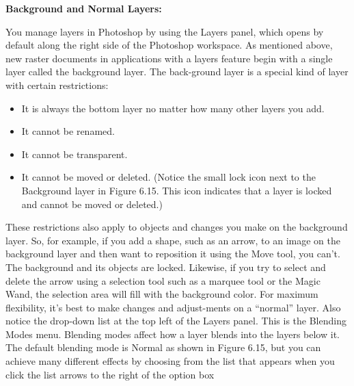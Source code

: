 \documentclass{report}
\begin{document}
    \bigbreak \noindent \bigbreak \noindent 
    \begin{large}
      \textbf{Background and Normal Layers:}
    \end{large}
    \bigbreak \noindent 
    You manage layers in Photoshop by using the Layers panel, which opens by default along the right side of the Photoshop workspace.
    \bigbreak \noindent 
    As mentioned above, new raster documents in applications with a layers feature begin with a single layer called the background layer.
    \bigbreak \noindent 
    The back-ground layer is a special kind of layer with certain restrictions:
    \bigbreak \noindent 
    \begin{itemize}
      \item It is always the bottom layer no matter how many other layers you add.
      \item It cannot be renamed.
      \item It cannot be transparent.
      \item It cannot be moved or deleted. (Notice the small lock icon next to the Background layer in Figure 6.15. This icon indicates that a layer is locked and cannot be moved or deleted.)
    \end{itemize}
    \bigbreak \noindent 
    These restrictions also apply to objects and changes you make on the background layer. So, for example, if you add a shape, such as an arrow, to an image on the background layer and then want to reposition it using the Move tool, you can’t. The background and its objects are locked. Likewise, if you try to select and delete the arrow using a selection tool such as a marquee tool or the Magic Wand, the selection area will fill with the background color. For maximum flexibility, it’s best to make changes and adjust-ments on a “normal” layer.
    \bigbreak \noindent 
    Also notice the drop-down list at the top left of the Layers panel. This is the Blending Modes menu. Blending modes affect how a layer blends into the layers below it. The default blending mode is Normal as shown in Figure 6.15, but you can achieve many different effects by choosing from the list that appears when you click the list arrows to the right of the option box
    \bigbreak \noindent 
    \bigbreak \noindent 
\end{document}
